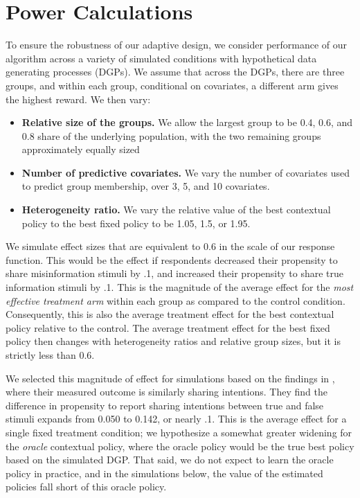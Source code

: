 \documentclass[letterpaper, 12pt, parskip=full,DIV=10]{scrartcl}
\begin{document}
\section{Power Calculations}
To ensure the robustness of our adaptive design, we consider performance of our algorithm across a variety of simulated conditions with hypothetical data generating processes (DGPs). We assume that across the DGPs, there are three groups, and within each group, conditional on covariates, a different arm gives the highest reward. We then vary:
\begin{itemize}
\item \textbf{Relative size of the groups.} We allow the largest group to be 0.4, 0.6, and 0.8 share of the underlying population, with the two remaining groups approximately equally sized
\item \textbf{Number of predictive covariates.} We vary the number of covariates used to predict group membership, over 3, 5, and 10 covariates. 
\item \textbf{Heterogeneity ratio.} We vary the relative value of the best contextual policy to the best fixed policy to be 1.05, 1.5, or 1.95. 
\end{itemize}

We simulate effect sizes that are equivalent to 0.6 in the scale of our response function. This would be the effect if respondents decreased their propensity to share misinformation stimuli by .1, and increased their propensity to share true information stimuli by .1. This is the magnitude of the average effect for the \textit{most effective treatment arm} within each group as compared to the control condition. Consequently, this is also the average treatment effect for the best contextual policy relative to the control. The average treatment effect for the best fixed policy then changes with heterogeneity ratios and relative group sizes, but it is strictly less than 0.6. 

We selected this magnitude of effect for simulations based on the findings in \cite{pennycook2020fighting}, where their measured outcome is similarly sharing intentions. They find the difference in propensity to report sharing intentions between true and false stimuli expands from 0.050 to 0.142, or nearly .1. This is the average effect for a single fixed treatment condition; we hypothesize a somewhat greater widening for the \textit{oracle} contextual policy, where the oracle policy would be the true best policy based on the simulated DGP. That said, we do not expect to learn the oracle policy in practice, and in the simulations below, the value of the estimated policies fall short of this oracle policy. 
\end{document}
